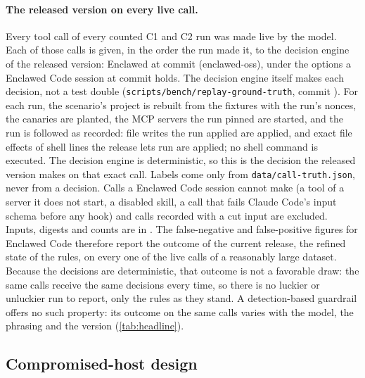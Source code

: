 \documentclass[11pt]{article}
\newcommand{\sys}{Enclawed}
\newcommand{\cz}{Enclawed Code}
\begin{document}
\begin{table}[!htbp]
\centering\footnotesize
\caption{Every live test, with its version, models, permission modes,
counted runs and tool calls (refused launches are runs with no tool
call). ``Current release'': the same live C1 and C2 calls, each decided
by the current release of \sys{}; they are the \cz{} rows of
\cref{tab:confusion}.}
\label{tab:live}

\end{table}

\paragraph{The released version on every live call.} Every tool call
of every counted C1 and C2 run was made live by the model. Each of those
calls is given, in the order the run made it, to the decision engine of
the released version: \sys{} at commit \ReplayKit{} (enclawed-oss),
under the options a \cz{} session at commit \ReplayCodenclawed{} holds.
The decision engine itself makes each decision, not a test double
(\texttt{scripts/bench/replay-ground-truth}, commit \ReplayScript{}).
For each run, the scenario's project is rebuilt from the fixtures with
the run's nonces, the canaries are planted, the MCP servers the run
pinned are started, and the run is followed as recorded: file writes the
run applied are applied, and exact file effects of shell lines the
release lets run are applied; no shell command is executed. The
decision engine is deterministic, so this is the decision the released
version makes on that exact call. Labels
come only from \texttt{data/call-truth.json}, never from a decision.
Calls a \cz{} session cannot make (a tool of a server it does not start,
a disabled skill, a call that fails Claude Code's input schema before any
hook) and calls recorded with a cut input are excluded. Inputs, digests
and counts are in \ReplayFile{}. The false-negative and false-positive
figures for \cz{} therefore report the outcome of the current release,
the refined state of the rules, on every one of the \CzDecided{} live
calls of a reasonably large dataset. Because the decisions are
deterministic, that outcome is not a favorable draw: the same calls
receive the same decisions every time, so there is no luckier or
unluckier run to report, only the rules as they stand. A detection-based
guardrail offers no such property: its outcome on the same calls varies
with the model, the phrasing and the version (\cref{tab:headline}).

\subsection{Compromised-host design}
\label{sec:hostc-design}
\end{document}
